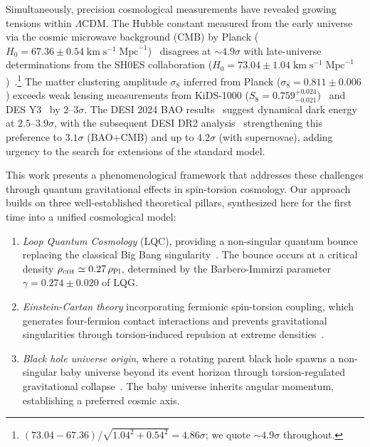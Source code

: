 \documentclass[aps,prd,twocolumn,superscriptaddress,showpacs,preprintnumbers,nofootinbib,longbibliography,floatfix]{revtex4-2}
\newcommand{\rhocrit}{\rho_{\rm crit}}
\newcommand{\rhoPl}{\rho_{\rm Pl}}
\begin{document}
Simultaneously, precision cosmological measurements have revealed growing tensions within $\Lambda$CDM. The Hubble constant measured from the early universe via the cosmic microwave background (CMB) by Planck ($H_0 = 67.36 \pm 0.54\;\text{km}\;\text{s}^{-1}\;\text{Mpc}^{-1}$)~\cite{Planck2018params} disagrees at ${\sim}4.9\sigma$ with late-universe determinations from the SH0ES collaboration ($H_0 = 73.04 \pm 1.04\;\text{km}\;\text{s}^{-1}\;\text{Mpc}^{-1}$)~\cite{Riess2022}.\footnote{$(73.04 - 67.36)/\sqrt{1.04^2 + 0.54^2} = 4.86\sigma$; we quote ${\sim}4.9\sigma$ throughout.} The matter clustering amplitude $\sigma_8$ inferred from Planck ($\sigma_8 = 0.811 \pm 0.006$) exceeds weak lensing measurements from KiDS-1000 ($S_8 = 0.759^{+0.024}_{-0.021}$)~\cite{KiDS2021} and DES Y3~\cite{DES2024} by $2$--$3\sigma$. The DESI 2024 BAO results~\cite{DESI2024} suggest dynamical dark energy at $2.5$--$3.9\sigma$, with the subsequent DESI DR2 analysis~\cite{DESI2025DR2} strengthening this preference to $3.1\sigma$ (BAO+CMB) and up to $4.2\sigma$ (with supernovae), adding urgency to the search for extensions of the standard model.

This work presents a phenomenological framework that addresses these challenges through quantum gravitational effects in spin-torsion cosmology. Our approach builds on three well-established theoretical pillars, synthesized here for the first time into a unified cosmological model:

\begin{enumerate}[leftmargin=*]
\item \textit{Loop Quantum Cosmology} (LQC), providing a non-singular quantum bounce replacing the classical Big Bang singularity~\cite{Ashtekar2011}. The bounce occurs at a critical density $\rhocrit \simeq 0.27\,\rhoPl$, determined by the Barbero-Immirzi parameter $\gamma = 0.274 \pm 0.020$ of LQG.

\item \textit{Einstein-Cartan theory} incorporating fermionic spin-torsion coupling, which generates four-fermion contact interactions and prevents gravitational singularities through torsion-induced repulsion at extreme densities~\cite{Hehl1976,Poplawski2012}.

\item \textit{Black hole universe origin}, where a rotating parent black hole spawns a non-singular baby universe beyond its event horizon through torsion-regulated gravitational collapse~\cite{Poplawski2016,Poplawski2019}. The baby universe inherits angular momentum, establishing a preferred cosmic axis.
\end{enumerate}
\end{document}
